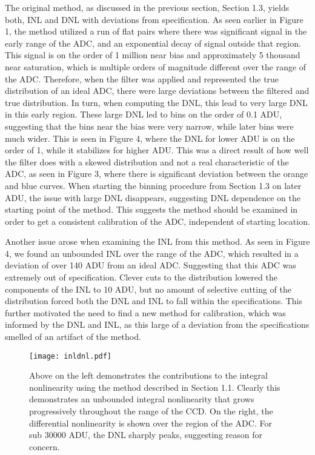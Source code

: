 \documentclass[11pt, letterpaper]{article}
\begin{document}
The original method, as discussed in the previous section, Section 1.3, yields both, INL and DNL with deviations from specification. 
As seen earlier in Figure 1, the method utilized a run of flat pairs where there was significant signal in the early range of the ADC, and an exponential decay of signal outside that region. 
This signal is on the order of 1 million near bias and approximately 5 thousand near saturation, which is multiple orders of magnitude different over the range of the ADC. 
Therefore, when the filter was applied and represented the true distribution of an ideal ADC, there were large deviations between the filtered and true distribution. 
In turn, when computing the DNL, this lead to very large DNL in this early region. 
These large DNL led to bins on the order of 0.1 ADU, suggesting that the bins near the bias were very narrow, while later bins were much wider. 
This is seen in Figure 4, where the DNL for lower ADU is on the order of 1, while it stabilizes for higher ADU. 
This was a direct result of how well the filter does with a skewed distribution and not a real characteristic of the ADC, as seen in Figure 3, where there is significant deviation between the orange and blue curves. 
When starting the binning procedure from Section 1.3 on later ADU, the issue with large DNL disappears, suggesting DNL dependence on the starting point of the method. 
This suggests the method should be examined in order to get a consistent calibration of the ADC, independent of starting location.
\indent 


Another issue arose when examining the INL from this method. 
As seen in Figure 4, we found an unbounded INL over the range of the ADC, which resulted in a deviation of over 140 ADU from an ideal ADC. 
Suggesting that this ADC was extremely out of specification. 
Clever cuts to the distribution lowered the components of the INL to 10 ADU, but no amount of selective cutting of the distribution forced both the DNL and INL to fall within the specifications. 
This further motivated the need to find a new method for calibration, which was informed by the DNL and INL, as this large of a deviation from the specifications smelled of an artifact of the method. 

\begin{figure}
	\texttt{[image: inldnl.pdf]}
	\caption{Above on the left demonstrates the contributions to the integral nonlinearity using the method described in Section 1.1. Clearly this demonstrates an unbounded integral nonlinearity that grows progressively throughout the range of the CCD. On the right, the differential nonlinearity is shown over the region of the ADC. For sub 30000 ADU, the DNL sharply peaks, suggesting reason for concern.}
\end{figure}
\end{document}
